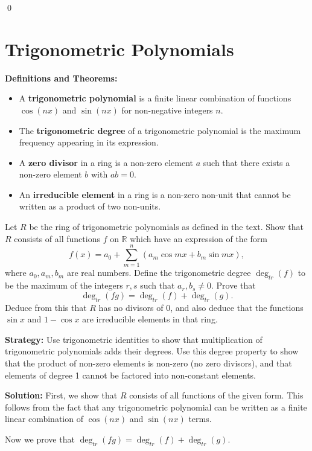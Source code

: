 \qed
\section{Trigonometric Polynomials}

\noindent\textbf{Definitions and Theorems:}
\begin{itemize}
\item A \textbf{trigonometric polynomial} is a finite linear combination of functions $\cos(nx)$ and $\sin(nx)$ for non-negative integers $n$.
\item The \textbf{trigonometric degree} of a trigonometric polynomial is the maximum frequency appearing in its expression.
\item A \textbf{zero divisor} in a ring is a non-zero element $a$ such that there exists a non-zero element $b$ with $ab = 0$.
\item An \textbf{irreducible element} in a ring is a non-zero non-unit that cannot be written as a product of two non-units.
\end{itemize}

\begin{problembox}
Let $R$ be the ring of trigonometric polynomials as defined in the text. Show that $R$ consists of all functions $f$ on $\mathbb{R}$ which have an expression of the form
\[ f(x) = a_0 + \sum_{m=1}^n (a_m \cos mx + b_m \sin mx), \]
where $a_0, a_m, b_m$ are real numbers. Define the trigonometric degree $\deg_{tr}(f)$ to be the maximum of the integers $r, s$ such that $a_r, b_s \neq 0$. Prove that
\[ \deg_{tr}(fg) = \deg_{tr}(f) + \deg_{tr}(g). \]
Deduce from this that $R$ has no divisors of $0$, and also deduce that the functions $\sin x$ and $1 - \cos x$ are irreducible elements in that ring.
\end{problembox}

\noindent\textbf{Strategy:} Use trigonometric identities to show that multiplication of trigonometric polynomials adds their degrees. Use this degree property to show that the product of non-zero elements is non-zero (no zero divisors), and that elements of degree 1 cannot be factored into non-constant elements.

\noindent\textbf{Solution:}
First, we show that $R$ consists of all functions of the given form. This follows from the fact that any trigonometric polynomial can be written as a finite linear combination of $\cos(nx)$ and $\sin(nx)$ terms.

Now we prove that $\deg_{tr}(fg) = \deg_{tr}(f) + \deg_{tr}(g)$.

